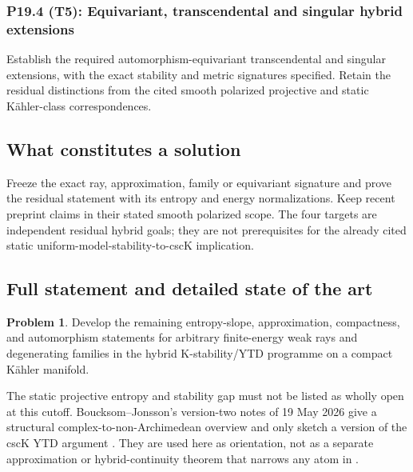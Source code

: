 \documentclass[11pt,a4paper]{article}
\theoremstyle{definition}
\newtheorem{problem}{Problem}[section]
\theoremstyle{remark}
\begin{document}
\subsubsection*{P19.4 (T5): Equivariant, transcendental and singular hybrid extensions}
\label{atom:P19.4}
Establish the required automorphism-equivariant transcendental and singular extensions, with the exact stability and metric signatures specified. Retain the residual distinctions from the cited smooth polarized projective and static K\"ahler-class correspondences.

\subsection{What constitutes a solution}
Freeze the exact ray, approximation, family or equivariant signature and prove the residual statement with its entropy and energy normalizations. Keep recent preprint claims in their stated smooth polarized scope. The four targets are independent residual hybrid goals; they are not prerequisites for the already cited static uniform-model-stability-to-cscK implication.

\subsection{Full statement and detailed state of the art}
\label{sec:ch72-hybrid-ytd}

\begin{problem}\label{prob:frontier-hybrid-ytd}
Develop the remaining entropy-slope, approximation, compactness, and
automorphism statements for arbitrary finite-energy weak rays and
degenerating families in the hybrid K-stability/YTD programme on a compact
Kähler manifold.
\end{problem}

The static projective entropy and stability gap must not be listed as wholly
open at this cutoff.  Boucksom--Jonsson's version-two notes of 19 May 2026
give a structural complex-to-non-Archimedean overview and only sketch a
version of the cscK YTD argument \cite{BJ26ComplexNA}.  They are used here
as orientation, not as a separate approximation or hybrid-continuity theorem
that narrows any atom in .
\end{document}
